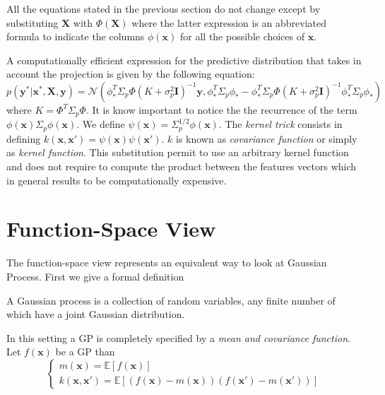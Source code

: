       \noindent All the equations stated in the previous section do not change except by substituting $\pmb{X}$ with $\Phi(\pmb{X})$ where
      the latter expression is an abbreviated formula to indicate the columns $\phi(\pmb{x})$ for all the possible choices of $\pmb{x}$.\newline

      \noindent A computationally efficient expression for the predictive distribution that takes in account the projection is given by the following equation:
      \begin{equation}
        p(\pmb{y}^{*}|\pmb{x}^{*}, \pmb{X}, \pmb{y}) = \mathcal{N}(\phi_{*}^{T} \Sigma_{p} \Phi (K + \sigma_{p}^{2} \pmb{I})^{-1} \pmb{y}, \phi_{*}^{T} \Sigma_{p} \phi_{*} - \phi_{*}^{T} \Sigma_{p} \Phi(K + \sigma_{p}^{2} \pmb{I})^{-1} \phi_{*}^{T} \Sigma_{p} \phi_{*})
      \end{equation}
      where $K = \Phi^{T} \Sigma_{p} \Phi$.\newline
      \noindent It is know important to notice the the recurrence of the term $\phi(\pmb{x}) \Sigma_{p} \phi(\pmb{x})$. We define $\psi(\pmb{x}) = \Sigma_{p}^{1/2} \phi(\pmb{x})$.
      The \textit{kernel trick} consists in defining $k(\pmb{x},\pmb{x}') = \psi(\pmb{x}) \psi(\pmb{x}')$. $k$ is known as \textit{covariance function} or simply as \textit{kernel function}.
      This substitution permit to use an arbitrary kernel function and does not require to compute the product between the features vectors which in general
      results to be computationally expensive.

  \section{Function-Space View}
    \noindent The function-space view represents an equivalent way to look at Gaussian Process. First we give a formal definition

    \begin{definition}
      A Gaussian process is a collection of random variables, any finite number of which have a joint Gaussian distribution.
    \end{definition}

    \noindent In this setting a GP is completely specified by a \textit{mean and covariance function}. Let $f(\pmb{x})$ be a GP than
    \begin{equation}
      \begin{cases}
        m(\pmb{x}) = \mathbb{E}[f(\pmb{x})] \\
        k(\pmb{x},\pmb{x}') = \mathbb{E}[(f(\pmb{x}) - m(\pmb{x})) (f(\pmb{x}') - m(\pmb{x}'))]
      \end{cases}
    \end{equation}

